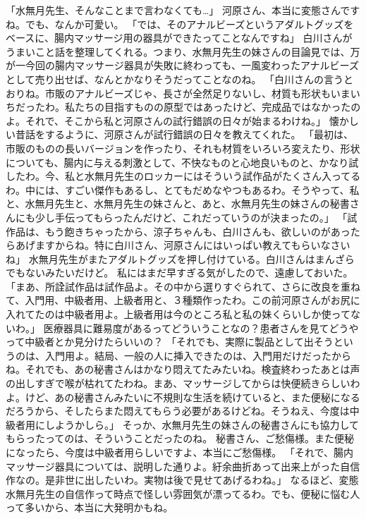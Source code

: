 「水無月先生、そんなことまで言わなくても…」
河原さん、本当に変態さんですね。でも、なんか可愛い。
「では、そのアナルビーズというアダルトグッズをベースに、腸内マッサージ用の器具ができたってことなんですね」
白川さんがうまいこと話を整理してくれる。つまり、水無月先生の妹さんの目論見では、万が一今回の腸内マッサージ器具が失敗に終わっても、一風変わったアナルビーズとして売り出せば、なんとかなりそうだってことなのね。
「白川さんの言うとおりね。市販のアナルビーズじゃ、長さが全然足りないし、材質も形状もいまいちだったわ。私たちの目指すものの原型ではあったけど、完成品ではなかったのよ。それで、そこから私と河原さんの試行錯誤の日々が始まるわけね。」
懐かしい昔話をするように、河原さんが試行錯誤の日々を教えてくれた。
「最初は、市販のものの長いバージョンを作ったり、それも材質をいろいろ変えたり、形状についても、腸内に与える刺激として、不快なものと心地良いものと、かなり試したわ。今、私と水無月先生のロッカーにはそういう試作品がたくさん入ってるわ。中には、すごい傑作もあるし、とてもだめなやつもあるわ。そうやって、私と、水無月先生と、水無月先生の妹さんと、あと、水無月先生の妹さんの秘書さんにも少し手伝ってもらったんだけど、これだっていうのが決まったの。」
「試作品は、もう飽きちゃったから、涼子ちゃんも、白川さんも、欲しいのがあったらあげますからね。特に白川さん、河原さんにはいっぱい教えてもらいなさいね」
水無月先生がまたアダルトグッズを押し付けている。白川さんはまんざらでもないみたいだけど。
私にはまだ早すぎる気がしたので、遠慮しておいた。
「まあ、所詮試作品は試作品よ。その中から選りすぐられて、さらに改良を重ねて、入門用、中級者用、上級者用と、３種類作ったわ。この前河原さんがお尻に入れてたのは中級者用よ。上級者用は今のところ私と私の妹くらいしか使ってないわ。」
医療器具に難易度があるってどういうことなの？患者さんを見てどうやって中級者とか見分けたらいいの？
「それでも、実際に製品として出そうというのは、入門用よ。結局、一般の人に挿入できたのは、入門用だけだったからね。それでも、あの秘書さんはかなり悶えてたみたいね。検査終わったあとは声の出しすぎで喉が枯れてたわね。まあ、マッサージしてからは快便続きらしいわよ。けど、あの秘書さんみたいに不規則な生活を続けていると、また便秘になるだろうから、そしたらまた悶えてもらう必要があるけどね。そうねえ、今度は中級者用にしようかしら。」
そっか、水無月先生の妹さんの秘書さんにも協力してもらったってのは、そういうことだったのね。
秘書さん、ご愁傷様。また便秘になったら、今度は中級者用らしいですよ、本当にご愁傷様。
「それで、腸内マッサージ器具については、説明した通りよ。紆余曲折あって出来上がった自信作なの。是非世に出したいわ。実物は後で見せてあげるわね。」
なるほど、変態水無月先生の自信作って時点で怪しい雰囲気が漂ってるわ。でも、便秘に悩む人って多いから、本当に大発明かもね。
